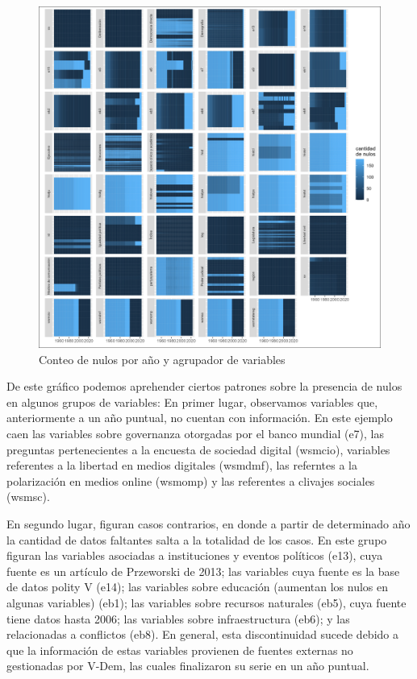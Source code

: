 \documentclass{article}
\begin{document}
\begin{figure}[H]
  \centering  
  \includegraphics[width=1\textwidth]{1_nas.png}
  \caption{Conteo de nulos por año y agrupador de variables\label{fig:nas}}
\end{figure}

De este gráfico podemos aprehender ciertos patrones sobre la presencia de nulos
en algunos grupos de variables: En primer lugar, observamos variables que,
anteriormente a un año puntual, no cuentan con información. En este ejemplo caen
las variables sobre governanza otorgadas por el banco mundial (e7), las preguntas
pertenecientes a la encuesta de sociedad digital (wsmcio), variables referentes a
la libertad en medios digitales (wsmdmf), las referntes a la polarización en medios
online (wsmomp) y las referentes a clivajes sociales (wsmsc).

En segundo lugar, figuran casos contrarios, en donde a partir de determinado año
la cantidad de datos faltantes salta a la totalidad de los casos. En este grupo
figuran las variables asociadas a instituciones y eventos políticos (e13), cuya 
fuente es un artículo de Przeworski de 2013; las variables cuya fuente es la base
de datos polity V (e14); las variables sobre educación (aumentan los nulos en algunas 
variables) (eb1); las variables sobre recursos naturales (eb5), cuya fuente tiene
datos hasta 2006; las variables sobre infraestructura (eb6); y las relacionadas a 
conflictos (eb8). En general, esta discontinuidad sucede debido a que la información
de estas variables provienen de fuentes externas no gestionadas por V-Dem, las cuales
finalizaron su serie en un año puntual.
\end{document}
